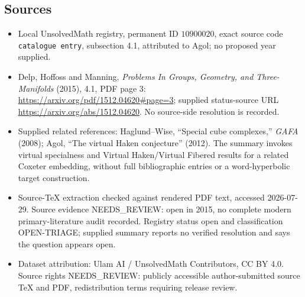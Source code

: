 \documentclass[11pt]{article}
\begin{document}
\subsection{Sources}
\begin{itemize}
\item Local UnsolvedMath registry, permanent ID \(10900020\), exact source code \texttt{catalogue entry}, subsection 4.1, attributed to Agol; no proposed year supplied.
\item Delp, Hoffoss and Manning, \emph{Problems In Groups, Geometry, and Three-Manifolds} (2015), 4.1, PDF page 3: \url{https://arxiv.org/pdf/1512.04620#page=3}; supplied status-source URL \url{https://arxiv.org/abs/1512.04620}. No source-side resolution is recorded.
\item Supplied related references: Haglund--Wise, ``Special cube complexes,'' \emph{GAFA} (2008); Agol, ``The virtual Haken conjecture'' (2012). The summary invokes virtual specialness and Virtual Haken/Virtual Fibered results for a related Coxeter embedding, without full bibliographic entries or a word-hyperbolic target construction.
\item Source-TeX extraction checked against rendered PDF text, accessed 2026-07-29. Source evidence NEEDS\_REVIEW: open in 2015, no complete modern primary-literature audit recorded. Registry status open and classification OPEN-TRIAGE; supplied summary reports no verified resolution and says the question appears open.
\item Dataset attribution: Ulam AI / UnsolvedMath Contributors, CC BY 4.0. Source rights NEEDS\_REVIEW: publicly accessible author-submitted source TeX and PDF, redistribution terms requiring release review.
\end{itemize}
\end{document}
